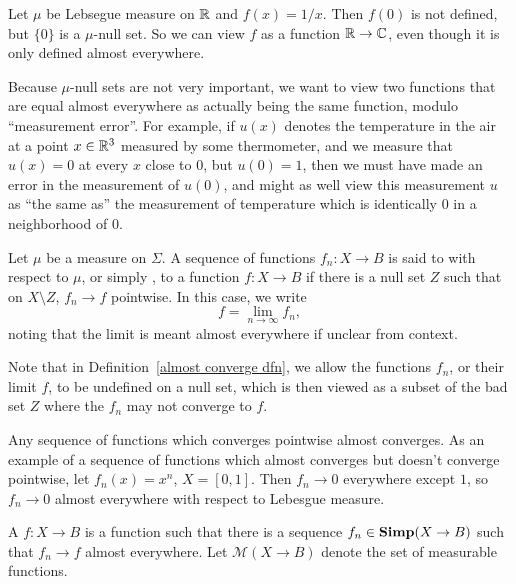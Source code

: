 \begin{example}
Let $\mu$ be Lebsegue measure on $\mathbb{R}$ and $f(x) = 1/x$.
Then $f(0)$ is not defined, but $\{0\}$ is a $\mu$-null set.
So we can view $f$ as a function $\mathbb{R} \to \mathbb{C}$, even though it is only defined almost everywhere.
\end{example}

\begin{subsec}
Because $\mu$-null sets are not very important, we want to view two functions that are equal almost everywhere as actually being the same function, modulo ``measurement error''.
For example, if $u(x)$ denotes the temperature in the air at a point $x \in \mathbb{R}^3$ measured by some thermometer, and we measure that $u(x) = 0$ at every $x$ close to $0$, but $u(0) = 1$, then we must have made an error in the measurement of $u(0)$, and might as well view this measurement $u$ as ``the same as'' the measurement of temperature which is identically $0$ in a neighborhood of $0$.
\end{subsec}

\begin{definition}
\label{almost converge dfn}
Let $\mu$ be a measure on $\Sigma$. A sequence of functions $f_{n}: X \to B$ is said to  with respect to $\mu$, or simply , to a function $f: X \to B$ if there is a null set $Z$ such that on $X \setminus Z$, $f_{n} \to f$ pointwise. In this case, we write
\[f = \lim_{n \to \infty} f_{n},\]
noting that the limit is meant almost everywhere if unclear from context.
\end{definition}

\begin{subsec}
Note that in Definition~\ref{almost converge dfn}, we allow the functions $f_{n}$, or their limit $f$, to be undefined on a null set, which is then viewed as a subset of the bad set $Z$ where the $f_{n}$ may not converge to $f$.
\end{subsec}

\begin{example}
Any sequence of functions which converges pointwise almost converges.
As an example of a sequence of functions which almost converges but doesn't converge pointwise, let $f_{n}(x) = x^n$, $X = [0, 1]$. Then $f_{n} \to 0$ everywhere except $1$, so $f_{n} \to 0$ almost everywhere with respect to Lebesgue measure.
\end{example}

\begin{definition}
A  $f: X \to B$ is a function such that there is a sequence $f_{n} \in \mathbf{Simp}(X \to B)$ such that $f_{n} \to f$ almost everywhere.
Let $\mathcal M(X \to B)$ denote the set of measurable functions.
\end{definition}

